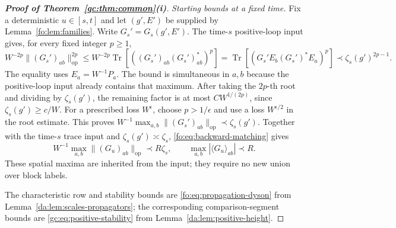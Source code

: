 \documentclass[11pt]{article}
\numberwithin{equation}{section}
\theoremstyle{remark}
\newcommand{\Tr}{\operatorname{Tr}}
\newcommand{\op}{\mathrm{op}}
\begin{document}
\begin{proof}[\textbf{Proof of Theorem~\ref{gc:thm:common}(i)}]
\emph{Starting bounds at a fixed time.}
Fix a deterministic $u\in[s,t]$ and let $(g',E')$ be supplied by
Lemma~\ref{fo:lem:families}. Write $G_s'=G_s(g',E')$. The time-$s$ positive-loop input gives,
for every fixed integer $p\ge1$,
\begin{equation}\label{fo:eq:starting-positive-loop}
 W^{-2p}\|(G_s')_{ab}\|_{\op}^{2p}
 \le W^{-2p}\Tr[((G_s')_{ab}(G_s')_{ab}^*)^p]
 =\Tr[(G_s'E_b(G_s')^*E_a)^p]
 \prec\zeta_s(g')^{2p-1}.
\end{equation}
The equality uses $E_a=W^{-1}P_a$. The bound is simultaneous in
$a,b$ because the positive-loop input already contains that maximum.
After taking the $2p$-th root and dividing by $\zeta_s(g')$, the
remaining factor is at most $CW^{1/(2p)}$, since
$\zeta_s(g')\ge c/W$. For a prescribed loss $W^\epsilon$, choose
$p>1/\epsilon$ and use a loss $W^{\epsilon/2}$ in the root estimate.
This proves $W^{-1}\max_{a,b}\|(G_s')_{ab}\|_{\op}\prec\zeta_s(g')$.
Together with the time-$s$ trace input and
$\zeta_s(g')\asymp\zeta_s$, \eqref{fo:eq:backward-matching} gives
\begin{equation}\label{fo:eq:rough-comparison}
 W^{-1}\max_{a,b}\|(G_u)_{ab}\|_{\op}\prec R\zeta_s,
 \qquad \max_{a,b}|\langle G_u\rangle_{ab}|\prec R.
\end{equation}
These spatial maxima are inherited from the input; they require no
new union over block labels.

The characteristic row and stability bounds are
\eqref{fo:eq:propagation-dyson} from
Lemma~\ref{da:lem:scales-propagators}; the corresponding comparison-segment
bounds are \eqref{gc:eq:positive-stability} from
Lemma~\ref{da:lem:positive-height}.


\end{proof}
\end{document}
